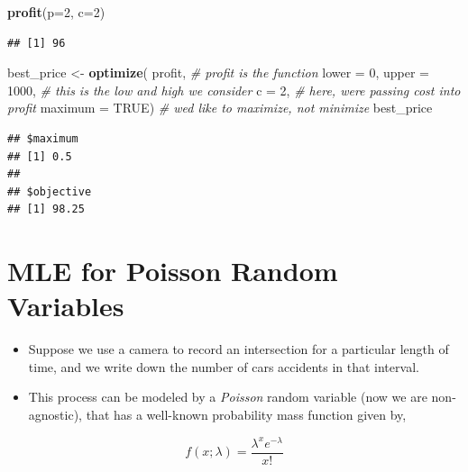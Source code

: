 \documentclass[
]{book}
\newenvironment{Shaded}{\begin{snugshade}}{\end{snugshade}}
\newcommand{\AttributeTok}[1]{\textcolor[rgb]{0.13,0.29,0.53}{#1}}
\newcommand{\CommentTok}[1]{\textcolor[rgb]{0.56,0.35,0.01}{\textit{#1}}}
\newcommand{\ConstantTok}[1]{\textcolor[rgb]{0.56,0.35,0.01}{#1}}
\newcommand{\DecValTok}[1]{\textcolor[rgb]{0.00,0.00,0.81}{#1}}
\newcommand{\FunctionTok}[1]{\textcolor[rgb]{0.13,0.29,0.53}{\textbf{#1}}}
\newcommand{\NormalTok}[1]{#1}
\newcommand{\OtherTok}[1]{\textcolor[rgb]{0.56,0.35,0.01}{#1}}
\providecommand{\tightlist}{%
  \setlength{\itemsep}{0pt}\setlength{\parskip}{0pt}}
\theoremstyle{definition}
\theoremstyle{definition}
\theoremstyle{definition}
\theoremstyle{definition}
\theoremstyle{remark}
\begin{document}
\begin{Shaded}
\begin{Highlighting}[]
\FunctionTok{profit}\NormalTok{(}\AttributeTok{p=}\DecValTok{2}\NormalTok{, }\AttributeTok{c=}\DecValTok{2}\NormalTok{)}
\end{Highlighting}
\end{Shaded}

\begin{verbatim}
## [1] 96
\end{verbatim}

\begin{Shaded}
\begin{Highlighting}[]
\NormalTok{best\_price }\OtherTok{\textless{}{-}} \FunctionTok{optimize}\NormalTok{(}
\NormalTok{  profit,                    }\CommentTok{\# profit is the function}
  \AttributeTok{lower =} \DecValTok{0}\NormalTok{, }\AttributeTok{upper =} \DecValTok{1000}\NormalTok{,   }\CommentTok{\# this is the low and high we consider}
  \AttributeTok{c =} \DecValTok{2}\NormalTok{,                     }\CommentTok{\# here, we\textquotesingle{}re passing cost into profit}
  \AttributeTok{maximum =} \ConstantTok{TRUE}\NormalTok{)            }\CommentTok{\# we\textquotesingle{}d like to maximize, not minimize}
\NormalTok{best\_price}
\end{Highlighting}
\end{Shaded}

\begin{verbatim}
## $maximum
## [1] 0.5
## 
## $objective
## [1] 98.25
\end{verbatim}

\hypertarget{mle-for-poisson-random-variables}{%
\section{MLE for Poisson Random Variables}\label{mle-for-poisson-random-variables}}

\begin{itemize}
\tightlist
\item
  Suppose we use a camera to record an intersection for a particular length of time, and we write down the number of cars accidents in that interval.\\
\item
  This process can be modeled by a \emph{Poisson} random variable (now we are non-agnostic), that has a well-known probability mass function given by,
\end{itemize}

\[
f(x;\lambda) = \frac{\lambda^x e^{-\lambda}}{x!}
\]
\end{document}
